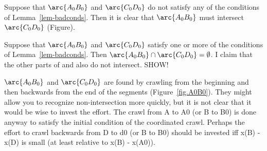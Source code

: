 {Suppose that $\arc{A_{0}B_{0}}$ and $\arc{C_{0}D_{0}}$ do not satisfy any of the 
conditions of Lemma~\ref{lem-badconds}.
Then it is clear that $\arc{A_{0}B_{0}}$ must intersect
$\arc{C_{0}D_{0}}$ (Figure).
%
%

Suppose that $\arc{A_{0}B_{0}}$ and $\arc{C_{0}D_{0}}$ satisfy one or more of the 
conditions of Lemma~\ref{lem-badconds}.
Then $\arc{A_{0}B_{0}} \cap \arc{C_{0}D_{0}} = \emptyset$.
I claim that the other parts of  and  also do not intersect.
SHOW!
\QED

$\arc{A_{0}B_{0}}$ and $\arc{C_{0}D_{0}}$ are found by crawling from the
beginning and then backwards from the end of the segments (Figure~\ref{fig.A0B0}).
They might allow you to recognize non-intersection more quickly, 
but it is not clear that it would be wise to invest the effort.
The crawl from A to A0 (or B to B0) is  done anyway to satisfy 
the initial condition of the coordinated crawl.
Perhaps  the effort to crawl backwards from D to d0 (or B to B0)
should be invested iff x(B) - x(D) is small (at least relative to
x(B) - x(A0)).
}

